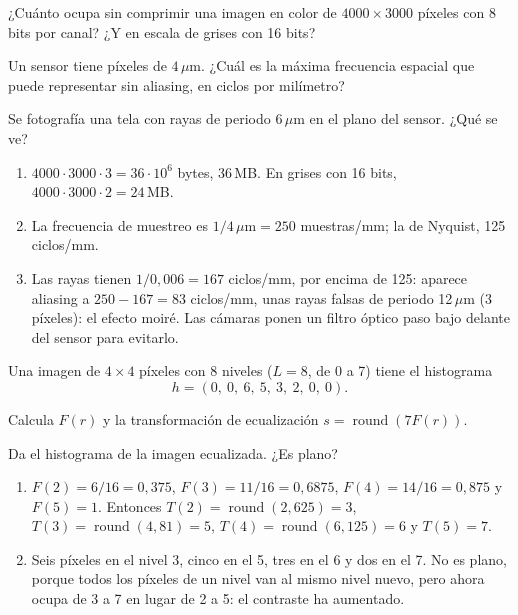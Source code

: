 \documentclass[11pt,a4paper]{scrartcl}
\begin{document}
\begin{ejercicio}
  \begin{incisos}[1]
    \item ¿Cuánto ocupa sin comprimir una imagen en color de $4000\times3000$ píxeles con 8 bits por canal? ¿Y en escala de grises con 16 bits?
    \item Un sensor tiene píxeles de $4\,\mu$m. ¿Cuál es la máxima frecuencia espacial que puede representar sin aliasing, en ciclos por milímetro?
    \item Se fotografía una tela con rayas de periodo $6\,\mu$m en el plano del sensor. ¿Qué se ve?
  \end{incisos}
\end{ejercicio}
\begin{solucion}
  \begin{enumerate}[label=\alph*)]
    \item $4000\cdot3000\cdot3=36\cdot10^6$ bytes, 36\,MB. En grises con 16 bits, $4000\cdot3000\cdot2=24$\,MB.
    \item La frecuencia de muestreo es $1/4\,\mu\text{m}=250$ muestras/mm; la de Nyquist, 125 ciclos/mm.
    \item Las rayas tienen $1/0{,}006=167$ ciclos/mm, por encima de 125: aparece aliasing a $250-167=83$ ciclos/mm, unas rayas falsas de periodo 12\,$\mu$m (3 píxeles): el efecto moiré. Las cámaras ponen un filtro óptico paso bajo delante del sensor para evitarlo.
  \end{enumerate}
\end{solucion}

\begin{ejercicio}
  Una imagen de $4\times4$ píxeles con 8 niveles ($L=8$, de 0 a 7) tiene el histograma
  \[
    h=(0,\ 0,\ 6,\ 5,\ 3,\ 2,\ 0,\ 0).
  \]
  \begin{incisos}[1]
    \item Calcula $F(r)$ y la transformación de ecualización $s=\operatorname{round}(7F(r))$.
    \item Da el histograma de la imagen ecualizada. ¿Es plano?
  \end{incisos}
\end{ejercicio}
\begin{solucion}
  \begin{enumerate}[label=\alph*)]
    \item $F(2)=6/16=0{,}375$, $F(3)=11/16=0{,}6875$, $F(4)=14/16=0{,}875$ y $F(5)=1$. Entonces $T(2)=\operatorname{round}(2{,}625)=3$, $T(3)=\operatorname{round}(4{,}81)=5$, $T(4)=\operatorname{round}(6{,}125)=6$ y $T(5)=7$.
    \item Seis píxeles en el nivel 3, cinco en el 5, tres en el 6 y dos en el 7. No es plano, porque todos los píxeles de un nivel van al mismo nivel nuevo, pero ahora ocupa de 3 a 7 en lugar de 2 a 5: el contraste ha aumentado.
  \end{enumerate}
\end{solucion}
\end{document}
